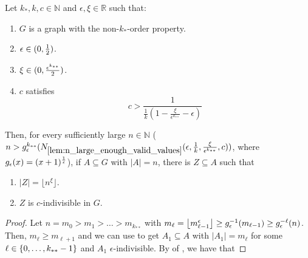     \begin{lemma}[Claim 4.21] \label{lem:many_values_to_equitative_partition_with_bound_exceptional_pairs}
        Let $k_*, k, c \in \mathbb{N}$ and $\epsilon, \xi \in \mathbb{R}$ such that:
        \begin{enumerate}
            \item\label{itm:many_values_to_equitative_partition_with_bound_exceptional_pairs.1} $G$ is a graph with the non-$k_*$-order property.
            \item\label{itm:many_values_to_equitative_partition_with_bound_exceptional_pairs.2} $\epsilon \in ( 0, \frac{1}{2} )$.
            \item\label{itm:many_values_to_equitative_partition_with_bound_exceptional_pairs.3} $\xi \in ( 0, \frac{\epsilon^{k_{**}}}{2} )$.
            \item\label{itm:many_values_to_equitative_partition_with_bound_exceptional_pairs.4} $c$ satisfies \[
                c > \frac{1}{\frac{1}{k} (1 - \frac{\xi}{\epsilon^{k_{**}}} - \epsilon)}
            \]
        \end{enumerate}
        Then, for every sufficiently large $n \in \mathbb{N}$ ($n >
        g_\epsilon^{k_{**}}( N_{\ref{lem:n_large_enough_valid_values}}( \epsilon, \frac{1}{k}, \frac{\xi}{\epsilon^{k_{**}}}, c ) )$,
        where $g_\epsilon(x) = ( x+1 )^{\frac{1}{\epsilon}}$),
        if $A \subseteq G$ with $|A| = n$, there is $Z \subseteq A$ such that
        \begin{enumerate}[label=(\alph*), ref=\alph*]
            \item\label{itm:many_values_to_equitative_partition_with_bound_exceptional_pairs.a} $|Z| = \lfloor n^\xi \rfloor$.
            \item\label{itm:many_values_to_equitative_partition_with_bound_exceptional_pairs.b} $Z$ is $c$-indivisible in $G$.
        \end{enumerate}
        \begin{proof}
            Let $n = m_0 > m_1 > \dots > m_{k_{**}}$ with $m_\ell = \left\lfloor m_{\ell-1}^\epsilon \right\rfloor \geq g_\epsilon^{-1}(m_{\ell-1}) \geq g_\epsilon^{-\ell}(n)$.
            Then, $m_\ell \geq m_{\ell+1}$ and we can use 
            to get $A_1 \subseteq A$ with $|A_1| = m_\ell$ for some $\ell \in \{ 0, \dots, k_{**}-1 \}$ and $A_1$ $\epsilon$-indivisible.
            By  of , we have that

\end{proof}
\end{lemma}
